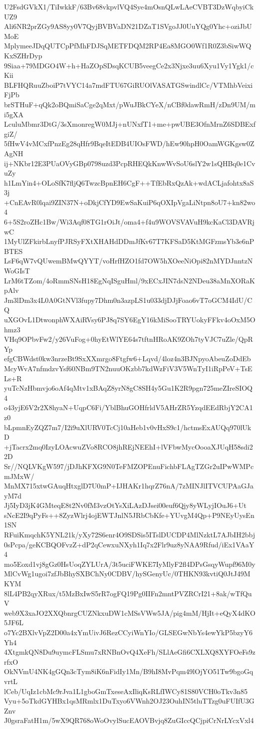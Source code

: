 U2FsdGVkX1/TiIwkkF/63Bv68vkpvlVQ4Sye4mOsnQLwLAeCVBT3DzWqbyiCkUZ9
Ali6NR2prZGy9AS8yy0V7QyjBVBVaDN21DZaT1SVgoJJ0UuYQg0Yhc+oziJbUMoE
MplymeeJDqQUTCpPfMhFDJSqMETFDQM2RP4Ea8MGO0Wf1R0Z3bSiwWQKxSZHrDyp
9Siaa+79MDGO4W+h+HaZOpSDsqKCUB5veegCe2x3Njxe3uu6Xyu1Vy1Ygk1/cKii
BLFHQRuuZboiP7tVYC14a7mdFTU67GiRUOlVASATGSwindlCc/VTMhbVeixiFjPb
brSTHuF+qQk2oBQmiSaCge2qMxt/pWuJBkCYeX/nCBf0dawRmH/zDn9UM/mi5gXA
LculuMbmr3DtG/3sXmonregW0MJj+nUNxfT1+me+pwUBE3OfnMrnZ6SDBExfgiZ/
5fHwV4vMCxfPnzEg28qHfr9BqeItEDB4UIOsFWD/hEw90hpH0OamWGKgsw0ZAgNH
ij+NKbr12E3PUaOVyGBp0798uzd3PcpRHEQkKnwWvSoU6slY2w1sQHBq0e1CvuZy
h1LmYin4+OLoSfK7fljQ6TwzcBpnEH6CgF++TfEbRxQzAk+wdACLjafohtx8aS3j
+CnEAvR0lqai9ZIN37N+oDkjCfYD9EwSaKuiP6qOXIpVgaLiNtpn8oU7+kn82wo4
6+5S2roZHc1Bw/Wi3Aqf08TG1rOiJt/oma4+f4u9WOVSVAVuH9kcKaCl3DAVRjwC
1MyUlZFkirbLnyfPJRSyFXtXHAHdDDmJfKv67T7KFSaD5KtMGFzmsYb3e6nPBTES
LsF6qW7vQUwemBMwQYYT/voHrfHZO1fd7OW5hXOeeNiOpi82nMYDJnntzNWoGIsT
LrM6tTZom/4oRmmSNsH18EgNqISguHml/9xECxJIN7dsN2NDeu38aMnXORaKpAlv
Jm3lDm3x4L0A0GtNVl3fupy7Dhm0n3azpLS1u033djDJjFoao6vT7oGCM4IdU/CQ
uXGOvL1DtwonphWXAiRVsy6PJ8q7SY6EgY16kMiSooTRYUokyFFkv4oOxM5Ohmz3
VHq9OPbvFw2/y26VuFog+0hyEtWlYE64s7tftnHRoAK9ZOh7tyVJC7uZle/QpRYp
efgCBWdst0kw3nrzeBt9SxXXmrgo8Ftgfw6+Lqvd/4loz4n3BJNpyoAbeuZoDdEb
McyWvA7nfmdzvYsf60NBm9TN2nuuOKzbb7kdWzFiV3V5WnTyI1iRpPeV+TsELs+R
yuTcNzHbmvjo6oAf4qMtv1xBAqZ8yrN8gC8SH4y5Gu1K2R9pgn725meZIreSIOQ4
o43yjE6V2r2X8hyaN+UqpC6Fi/YblBhuGOHfrldV5AHrZR5YzqdEEdRbjY2CA1z0
bLpmnEyZQZ7m7/I2i9uXlURV0TcCj10aHeb1v0vHxS9c1/hctmsExAUQq970lUkD
+jTacrx2mq0IzyLOAcwuZVo8RCO8jhREjNEEhI+lVFbwMycOooaXJUqH58sdi22D
Sr//NQLVKgW597/jDJhKFXG9N0TeFMZOPEnuFichbFLAgTZGr2uIPwWMPcmJMxW/
MnMX715xtwGAuqHtxglD7U0mP+IJHAKr1hqrZ76nA/7zMINJlITVCUPAaGJayM7d
Jj5IyD3jK4GMteqE8t2Nv0fM3vzOtYsXiLAzDJsei00euf6Qjy8yWLyjIOuJ6+Ut
sNcE2I9qPyFs++8ZyzWlrj4ojEWTJnlN5JRbCbKfe+YUvgM4Qp+P9NEyUysEn1SN
RFuiKmqchK5YNL21k/yXy72S6enr4O9SDSis5ITslDUCDP4MlNzktL7AJbIH2bbj
0sPcpa/geKCBQOFvzZ+dP2qCewxuNXyh1Iq7x2Flr9uz8yNAA9Rfud/iEx1VAaY4
mo5Eoxd1vj8gGz0HsUoqZYLUrA/3t5uciFWKE7IyMlyF2fl4DPsGsqyWupf96M0y
MlCvWg1ugoi7zfJbBhySXBChNy0CDBV/hySGenyUc/0THKN93kvtiQ0JtJ49MKYM
8lL4PB2qyXRux/t5MzBxIwS5rR7ogFQ19Pg0IIFn2mntPVZRCrI21+8ak/wTfQuV
web9X3xaJO2XXQbnrgCUZNkxuDW1cMSsVWw5JA/pig4mM/HjIt+eQyX4dKO5JF6L
o7Yc2BXlvVpZ2D00a4xYmUivJ6RezCCyiWnYIo/GLSEGwNbYs4ewYkP5bzyY6Yh4
4XtgmkQN8Du9uymcFLSmu7xRNBnOvQ4XeFh/SLlAeGfi6CXLXQ8XYFOeFs9zrfxO
OkNVmU4NK4gGQn3cTym8iK6nFidIy1Mn/B9hI8MvPqm49lOjYO51Tw9bgoGqvrtL
lCeb/UqIz1cbMc9rJva1L1gboGmTxeseAxIliqKsRLfIWCy81S80VCH0oTkv3n85
Vyu+5oTkdGYHBx1qsMRmlx1DuTxyo6VWnh2OJ23OuhIN5tluTTzg0uFUIfU3GZnv
J0gsraFatH1m/5wX9QR768oWoOvylSucEAOVBvjq8ZuGIccQCjpiCrNrLYcxVxl4
